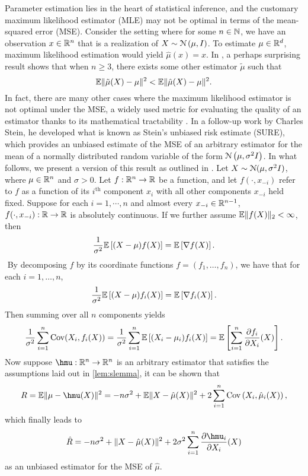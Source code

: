 Parameter estimation lies in the heart of statistical inference, and the customary maximum likelihood estimator (MLE) may not be optimal in terms of the mean-squared error (MSE). Consider the setting where for some $n\in\mathbb{N}$, we have an observation $x\in\mathbb{R}^n$ that is a realization of $X \sim \mathcal{N}\left(\mu, I\right)$. To estimate $\mu\in\mathbb{R}^d$, maximum likelihood estimation would yield $\hat{\mu}(x) = x$. In \citet{stein1956variate}, a perhaps surprising result shows that when $n\geq3$, there exists some other estimator $\tilde{\mu}$ such that
\[
\mathbb{E}\| \tilde{\mu}(X) - \mu \|^2 < \mathbb{E}\| \hat{\mu}(X) - \mu \|^2.
\]
In fact, there are many other cases where the maximum likelihood estimator is not optimal under the MSE, a widely used metric for evaluating the quality of an estimator thanks to its mathematical tractability \citep{berger1975minimax,degroot2005optimal}. In a follow-up work by Charles Stein, he developed what is known as Stein's unbiased risk estimate (SURE), which provides an unbiased estimate of the MSE of an arbitrary estimator for the mean of a normally distributed random variable of the form $\mathcal{N}\left(\mu, \sigma^2I\right)$. In what follows, we present a version of this result as outlined in \citet{tibshirani2015stein}.
\blem\label{lem:slemma}
Let $X\sim\mathcal{N}(\mu, \sigma^2I)$, where $\mu\in\mathbb{R}^n$ and $\sigma>0$. Let $f: \mathbb{R}^n\to\mathbb{R}$ be a function, and let $f(\cdot, x_{-i})$ refer to $f$ as a function of its $i^{\text{th}}$ component $x_i$ with all other components $x_{-i}$ held fixed. Suppose for each $i=1,\cdots,n$ and almost every $x_{-i}\in\mathbb{R}^{n-1}$, $f(\cdot, x_{-i}):\mathbb{R}\to\mathbb{R}$ is absolutely continuous. If we further assume $\mathbb{E}\|f(X)\|_2 < \infty$,  then 
\[
\frac{1}{\sigma^2}\mathbb{E}\left[ (X-\mu)f(X) \right] = \mathbb{E}\left[ \nabla f(X) \right].
\]
\elem
$ $\newline
By decomposing $f$ by its coordinate functions $f = (f_1,\dots,f_n)$, we have that for each $i=1,\dots,n$,
\[
\frac{1}{\sigma^2}\mathbb{E}\left[ (X-\mu)f_i(X) \right] = \mathbb{E}\left[ \nabla f_i(X) \right].
\]
Then summing over all $n$ components yields
\[
\frac{1}{\sigma^2}\sum_{i=1}^n\operatorname{Cov}(X_i, f_i(X)) = \frac{1}{\sigma^2}\sum_{i=1}^n \mathbb{E}\left[ (X_i - \mu_i)f_i(X) \right] = \mathbb{E}\left[ \sum_{i=1}^n \frac{\partial f_i}{\partial X_i}(X) \right].
\]
Now suppose $\hmu:\reals^n\to\reals^n$ is an arbitrary estimator that satisfies the assumptions laid out in \cref{lem:slemma}, it can be shown that
\[
R = \EE\| \mu - \hmu(X) \|^2 = -n\sigma^2 + \EE \| X - \hat{\mu}(X) \|^2 + 2\sum_{i=1}^n \cov\left( X_i, \hat{\mu}_i(X) \right),
\]
which finally leads to
\[
\hat{R} = -n\sigma^2 + \| X - \hat{\mu}(X) \|^2 + 2\sigma^2\sum_{i=1}^n \frac{\partial \hmu_i}{\partial X_i}(X)
\]
as an unbiased estimator for the MSE of $\hat{\mu}$.

